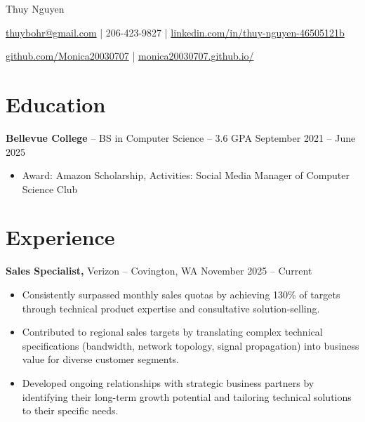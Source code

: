 \documentclass[11pt]{article}       %
\begin{document}
\centerline{\Huge Thuy Nguyen}

\vspace{5pt}

\centerline{\href{mailto:thuybohr@gmail.com}{thuybohr@gmail.com} | 206-423-9827 |
\href{https://www.linkedin.com/in/thuy-nguyen-46505121b/}{linkedin.com/in/thuy-nguyen-46505121b}}

\centerline{\href{https://github.com/Monica20030707}{github.com/Monica20030707} | 
\href{https://monica20030707.github.io/}{monica20030707.github.io/}} 

\vspace{-9pt}

\section*{Education}
\textbf{Bellevue College} -- BS in Computer Science -- 3.6 GPA \hfill September 2021 -- June 2025\\
\vspace{-9pt}
\begin{itemize}
  \item Award: Amazon Scholarship, Activities: Social Media Manager of Computer Science Club
\end{itemize}

\vspace{-18.5pt}

\section*{Experience}

\textbf{Sales Specialist,} {Verizon} -- Covington, WA \hfill November 2025 -- Current \\
\vspace{-9pt}
\begin{itemize}
  \item Consistently surpassed monthly sales quotas by achieving 130\% of targets through technical product expertise and consultative solution-selling.
  \item Contributed to regional sales targets by translating complex technical specifications (bandwidth, network topology, signal propagation) into business value for diverse customer segments.
  \item Developed ongoing relationships with strategic business partners by identifying their long-term growth potential and tailoring technical solutions to their specific needs.
\end{itemize}
\end{document}
